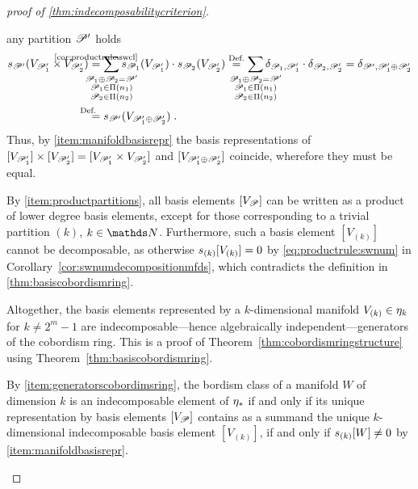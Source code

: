 \begin{proof}[proof of \autoref{thm:indecomposabilitycriterion}]
\begin{steps}
    any partition $\mathscr{P}'$ holds
    \begin{align*}
      \s{\Part'}(V_{\Part_1'}\times V_{\Part_2'})
      &\cequalsby{\ref{cor:productrule:swcl}}
        \sum_{\mathclap{\substack{
        \Part_1\concat\Part_2=\Part'\\
      \Part_1\in\PartitionsOf{n_1}\\
      \Part_2\in\PartitionsOf{n_2}\\
      }}}
      \s{\Part_1}(V_{\Part_1'}) \cdot \s{\Part_2}(V_{\Part_2'})
      \overset{\text{Def.}}=
        \sum_{\mathclap{\substack{
        \Part_1\concat\Part_2=\Part'\\
      \Part_1\in\PartitionsOf{n_1}\\
      \Part_2\in\PartitionsOf{n_2}\\
      }}}
      \delta_{\Part_1,\Part_1'} \cdot \delta_{\Part_2, \Part_2'}
      = \delta_{\Part', \Part_1'\concat\Part_2'}
      \\
      &\equalsby{Def.} \s{\Part'}(V_{\Part_1'\concat\Part_2'})
        \;.
    \end{align*}
    Thus, by \ref{item:manifoldbasisrepr}
    the basis representations of
    $[V_{\mathscr{P}_1'}]\times[V_{\mathscr{P}_2'}]=[V_{\mathscr{P}_1'}\times V_{\mathscr{P}_2'}]$
    and 
    $[V_{\mathscr{P}_1'\oplus\mathscr{P}_2'}]$
    coincide, wherefore they must be equal. 
  \item\label{item:generatorscobordimsring}
    By \ref{item:productpartitions}, all basis elements
    $[V_{\mathscr{P}}]$ can be written as a product of lower degree basis
    elements, except for those corresponding to a trivial partition
    $(k)$, $k\in\Nat$.
    Furthermore, such a basis element $[V_{(k)}]$ cannot be
    decomposable, as otherwise $s_{(k)}[V_{(k)}] = 0$
    by \autoref{eq:productrule:swnum} in
    Corollary~\autoref{cor:swnumdecompositionmfds},
    which contradicts the definition in
    \autoref{thm:basiscobordismring}.
    
    Altogether, the basis elements represented by a $k$-dimensional
    manifold $V_{(k)}\in\eta_k$ for $k\neq 2^m-1$ are
    indecomposable---hence algebraically independent---generators of
    the cobordism ring.
    This is a proof of Theorem~\ref{thm:cobordismringstructure} using
    Theorem~\ref{thm:basiscobordismring}.
  \item By \ref{item:generatorscobordimsring}, the bordism
    class of a manifold $W$ of dimension $k$ is an indecomposable
    element of $\eta_*$ if and only if its unique representation by
    basis elements $[V_{\mathscr{P}}]$ contains as a summand the unique
    $k$-dimensional indecomposable basis element $[V_{(k)}]$,
    \idest if and only if $s_{(k)}[W]\neq 0$ by
    \ref{item:manifoldbasisrepr}.
    \qedhere
  \end{steps}
\end{proof}

